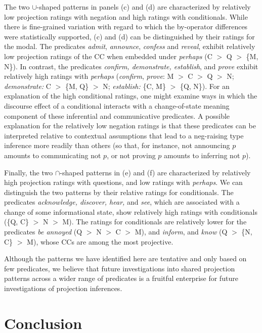 \documentclass[a4paper,12pt,twoside]{article}
\begin{document}
The two $\cup$-shaped patterns in panels (c) and (d) are characterized by relatively low projection ratings with negation and high ratings with conditionals. While there is fine-grained variation with regard to which the by-operator differences were statistically supported, (c) and (d) can be distinguished by their ratings for the modal. The predicates \emph{admit}, \emph{announce}, \emph{confess} and \emph{reveal}, exhibit relatively low projection ratings of the CC when embedded under \emph{perhaps} (C $>$ Q  $>$ \{M, N\}). In contrast, the predicates \emph{confirm, demonstrate, establish}, and \emph{prove} exhibit relatively high ratings with \emph{perhaps} (\emph{confirm}, \textit{prove}: M $>$ C $>$ Q $>$ N; \emph{demonstrate:} C $>$ \{M, Q\} $>$ N; \emph{establish:} \{C, M\} $>$ \{Q, N\}). For an explanation of the high conditional ratings, one might examine ways in which the discourse effect of a conditional interacts with a change-of-state meaning component of these inferential and communicative predicates. A possible explanation for the relatively low negation ratings is that these predicates can be interpreted relative to contextual assumptions that lead to a neg-raising type inference more readily than others (so that, for instance, not announcing $p$ amounts to communicating not $p$, or not proving $p$ amounts to inferring not $p$).
	
	Finally, the two $\cap$-shaped patterns in (e) and (f) are characterized by relatively high projection ratings with questions, and low ratings with {\em perhaps}. We can distinguish the two patterns by their relative ratings for conditionals. The predicates \emph{acknowledge, discover, hear,} and \emph{see}, which are associated with a change of some informational state, show relatively high ratings with conditionals (\{Q, C\} $>$ N $>$ M). The ratings for conditionals are relatively lower for the predicates \emph{be annoyed} (Q $>$ N $>$ C $>$ M), and \emph{inform}, and \emph{know} (Q $>$ \{N, C\} $>$ M), whose CCs are among the most projective.

    Although the patterns we have identified here are tentative and only based on few predicates, we believe that future investigations into shared projection patterns across a wider range of predicates is a fruitful enterprise for future investigations of projection inferences.

\section{Conclusion}
\end{document}
